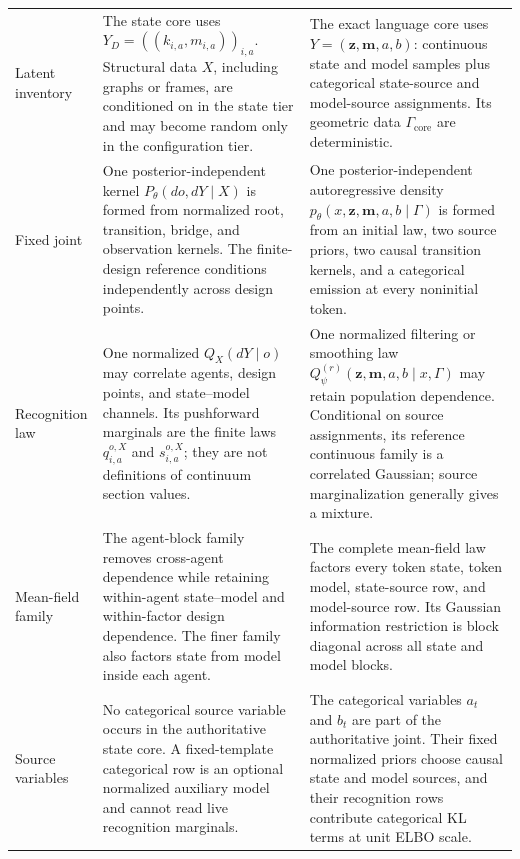 \begin{longtable}{>{\raggedright\arraybackslash}p{}>{\raggedright\arraybackslash}p{}>{\raggedright\arraybackslash}p{}}
\addlinespace
Latent inventory & The state core uses \(Y_D=((k_{i,a},m_{i,a}))_{i,a}\). Structural data \(X\), including graphs or frames, are conditioned on in the state tier and may become random only in the configuration tier. & The exact language core uses \(Y=(\boldsymbol z,\boldsymbol m,a,b)\): continuous state and model samples plus categorical state-source and model-source assignments. Its geometric data \(\Gamma_{\mathrm{core}}\) are deterministic. \\
\addlinespace
Fixed joint & One posterior-independent kernel \(P_\theta(do,dY\mid X)\) is formed from normalized root, transition, bridge, and observation kernels. The finite-design reference conditions independently across design points. & One posterior-independent autoregressive density \(p_\theta(x,\boldsymbol z,\boldsymbol m,a,b\mid\Gamma)\) is formed from an initial law, two source priors, two causal transition kernels, and a categorical emission at every noninitial token. \\
\addlinespace
Recognition law & One normalized \(Q_X(dY\mid o)\) may correlate agents, design points, and state--model channels. Its pushforward marginals are the finite laws \(q_{i,a}^{o,X}\) and \(s_{i,a}^{o,X}\); they are not definitions of continuum section values. & One normalized filtering or smoothing law \(Q_\psi^{(r)}(\boldsymbol z,\boldsymbol m,a,b\mid x,\Gamma)\) may retain population dependence. Conditional on source assignments, its reference continuous family is a correlated Gaussian; source marginalization generally gives a mixture. \\
\addlinespace
Mean-field family & The agent-block family removes cross-agent dependence while retaining within-agent state--model and within-factor design dependence. The finer family also factors state from model inside each agent. & The complete mean-field law factors every token state, token model, state-source row, and model-source row. Its Gaussian information restriction is block diagonal across all state and model blocks. \\
\addlinespace
Source variables & No categorical source variable occurs in the authoritative state core. A fixed-template categorical row is an optional normalized auxiliary model and cannot read live recognition marginals. & The categorical variables \(a_t\) and \(b_t\) are part of the authoritative joint. Their fixed normalized priors choose causal state and model sources, and their recognition rows contribute categorical KL terms at unit ELBO scale. \\

\end{longtable}
